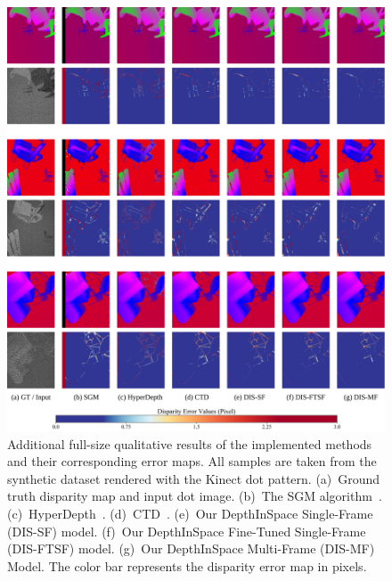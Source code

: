 \begin{figure}
    \begin{center}
        \includegraphics[width=1\linewidth]{images/chapter2/supp_figures/supp_results_1.jpg}
    \end{center}
   \caption{Additional full-size qualitative results of the implemented methods and their corresponding error maps. All samples are taken from the synthetic dataset rendered with the Kinect dot pattern. (a)~Ground truth disparity map and input dot image. (b)~The SGM algorithm~\citep{hirschmuller2007stereo}. (c)~HyperDepth~\citep{ryan2016hyperdepth}. (d)~CTD~\citep{riegler2019connecting}. (e)~Our DepthInSpace Single-Frame (DIS-SF) model. (f)~Our DepthInSpace Fine-Tuned Single-Frame (DIS-FTSF) model. (g)~Our DepthInSpace Multi-Frame (DIS-MF) Model. The color bar represents the disparity error map in pixels.}
    \label{fig:c2_kinect_results}
\end{figure}

